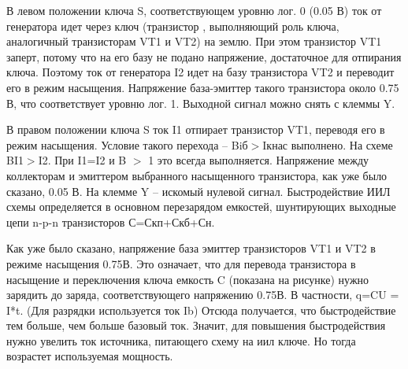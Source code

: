 В левом положении ключа S, соответствующем уровню  лог. 0 (0.05 В) ток от генератора идет через ключ (транзистор , выполняющий роль ключа, аналогичный транзисторам VT1 и VT2) на землю. При этом транзистор VT1 заперт, потому что на его базу не подано напряжение, достаточное для отпирания ключа. Поэтому ток от генератора I2 идет на базу транзистора VT2 и переводит его в режим насыщения. Напряжение база-эмиттер такого транзистора около 0.75 В, что соответствует уровню лог. 1. Выходной сигнал можно снять с клеммы Y.

В правом положении ключа S ток I1 отпирает транзистор VT1, переводя его в режим насыщения. Условие такого перехода -- Biб$>$Iкнас выполнено. На схеме BI1$>$I2. При I1=I2 и B $>$ 1 это всегда выполняется. Напряжение между коллекторам и эмиттером выбранного насыщенного транзистора, как уже было сказано, 0.05 В. На клемме Y -- искомый нулевой сигнал.
Быстродействие ИИЛ схемы определяется в основном перезарядом емкостей, шунтирующих выходные цепи n-p-n транзисторов С=Скп+Скб+Сн.
\begin{center}
	\begin{figure}[h!]
		\caption{}	
		\label{iil9}
	\end{figure}
\end{center}


Как уже было сказано, напряжение база эмиттер транзисторов VT1 и VT2 в режиме насыщения 0.75В. Это означает, что для перевода транзистора в насыщение и переключения ключа емкость C (показана на рисунке) нужно зарядить до заряда, соответствующего напряжению 0.75В. В частности, q=CU = I*t. (Для разрядки используется ток Ib) Отсюда получается, что быстродействие тем больше, чем больше базовый ток. Значит, для повышения быстродействия нужно увелить ток источника, питающего схему на иил ключе. Но тогда возрастет используемая мощность.




